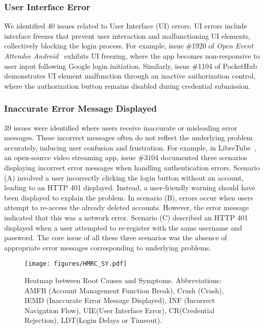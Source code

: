 \subsubsection{User Interface Error}
We identified 40 issues related to User Interface (UI) errors. UI errors include interface freezes that prevent user interaction and malfunctioning UI elements, collectively blocking the login process. For example, issue \#1920 of \textit{Open Event Attendee Android}~\cite{open-event-attendee-android} exhibits UI freezing, where the app becomes non-responsive to user input following Google login initiation. Similarly, issue \#1104 of PocketHub~\cite{PocketHub} demonstrates UI element malfunction through an inactive authorization control, where the authorization button remains disabled during credential submission.

\subsubsection{Inaccurate Error Message Displayed}\label{InaccurateErrorMessageDisplayed}
39 issues were identified where users receive inaccurate or misleading error messages. These incorrect messages often do not reflect the underlying problem accurately, inducing user confusion and frustration. For example, in LibreTube~\cite{LibreTube}, an open-source video streaming app, issue \#3104 documented three scenarios displaying incorrect error messages when handling authentication errors.
Scenario (A) involved a user incorrectly clicking the login button without an account, leading to an HTTP 401 displayed. Instead, a user-friendly warning should have been displayed to explain the problem. In scenario (B), errors occur when users attempt to re-access the already deleted accounts. However, the error message indicated that this was a network error. Scenario (C) described an HTTP 401 displayed when a user attempted to re-register with the same username and password.
The core issue of all these three scenarios was the absence of appropriate error messages corresponding to underlying problems.



\begin{figure}[ht!]
  \centering
\texttt{[image: figures/HMRC\_SY.pdf]}
  \caption{Heatmap between Root Causes and Symptoms.  Abbreviations: AMFB (Account Management Function Break), Crash (Crash), IEMD (Inaccurate Error Message Displayed), INF (Incorrect Navigation Flow), UIE(User Interface Error), CR(Credential Rejection), LDT(Login Delays or Timeout).}
  \label{fig:btRCvsSymp}
\end{figure}

